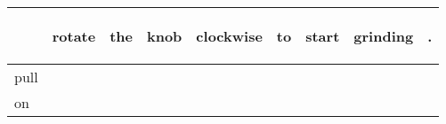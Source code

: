 \documentclass[landscape]{article}
\newcommand{\ssp}{\hspace{2pt}}
\begin{document}
\noindent\begin{tabular}{|l|p{10pt}|p{10pt}|p{10pt}|p{10pt}|p{10pt}|p{10pt}|p{10pt}|p{10pt}|}
\hline
&\begin{sideways}\cellcolor{ref0}rotate\hspace{12pt}\end{sideways}&\begin{sideways}\cellcolor{ref1}the\hspace{12pt}\end{sideways}&\begin{sideways}\cellcolor{ref2}knob\hspace{12pt}\end{sideways}&\begin{sideways}\cellcolor{ref3}clockwise\hspace{12pt}\end{sideways}&\begin{sideways}\cellcolor{ref4}to\hspace{12pt}\end{sideways}&\begin{sideways}\cellcolor{ref5}start\hspace{12pt}\end{sideways}&\begin{sideways}\cellcolor{ref6}grinding\hspace{12pt}\end{sideways}&\begin{sideways}\cellcolor{ref7}.\hspace{12pt}\end{sideways}\\
\hline
\ssp pull \ssp&\hspace{2pt}&\hspace{2pt}&\hspace{2pt}&\hspace{2pt}&\hspace{2pt}&\hspace{2pt}&\hspace{2pt}&\hspace{2pt}\\
\hline
\ssp on \ssp&\hspace{2pt}&\hspace{2pt}&\hspace{2pt}&\hspace{2pt}&\hspace{2pt}&\hspace{2pt}&\hspace{2pt}&\hspace{2pt}\\

\end{tabular}
\end{document}
